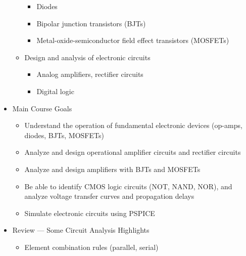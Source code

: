 \begin{itemize}
\begin{itemize}
\begin{itemize}
          \item Diodes

          \item Bipolar junction transistors (BJTs)

          \item Metal-oxide-semiconductor field effect transistors (MOSFETs)

        \end{itemize}

      \item Design and analysis of electronic circuits

        \begin{itemize}

          \item Analog amplifiers, rectifier circuits

          \item Digital logic

        \end{itemize}

    \end{itemize}

  \item Main Course Goals

    \begin{itemize}

      \item Understand the operation of fundamental electronic devices (op-amps, diodes, BJTs, MOSFETs)

      \item Analyze and design operational amplifier circuits and rectifier circuits

      \item Analyze and design amplifiers with BJTs and MOSFETs

      \item Be able to identify CMOS logic circuits (NOT, NAND, NOR), and analyze voltage transfer curves and propagation delays

      \item Simulate electronic circuits using PSPICE

    \end{itemize}

  \item Review — Some Circuit Analysis Highlights

    \begin{itemize}

      \item Element combination rules (parallel, serial)


\end{itemize}
\end{itemize}
